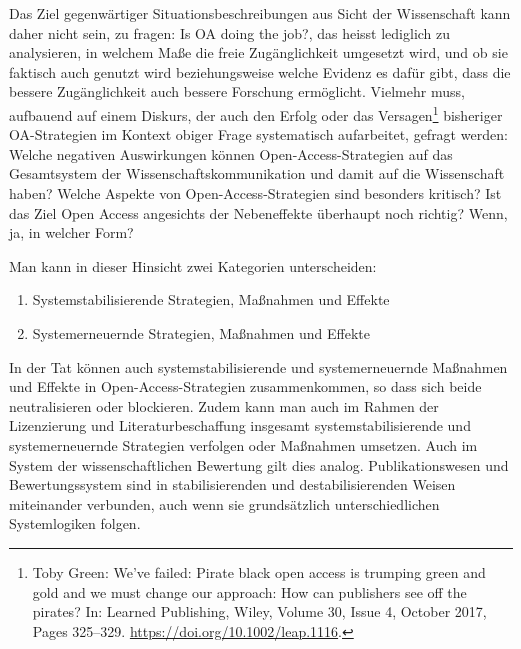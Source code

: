 \documentclass[a4paper,
fontsize=11pt,
oneside,
numbers=noperiodatend,
parskip=half-,
bibliography=totoc,
final
]{scrartcl}
\begin{document}
Das Ziel gegenwärtiger Situationsbeschreibungen aus Sicht der
Wissenschaft kann daher nicht sein, zu fragen: Is OA doing the job?, das
heisst lediglich zu analysieren, in welchem Maße die freie
Zugänglichkeit umgesetzt wird, und ob sie faktisch auch genutzt wird
beziehungsweise welche Evidenz es dafür gibt, dass die bessere
Zugänglichkeit auch bessere Forschung ermöglicht. Vielmehr muss,
aufbauend auf einem Diskurs, der auch den Erfolg oder das
Versagen\footnote{Toby Green: We've failed: Pirate black open access is
  trumping green and gold and we must change our approach: How can
  publishers see off the pirates? In: Learned Publishing, Wiley, Volume
  30, Issue 4, October 2017, Pages 325--329.
  \url{https://doi.org/10.1002/leap.1116}.} bisheriger OA-Strategien im
Kontext obiger Frage systematisch aufarbeitet, gefragt werden: Welche
negativen Auswirkungen können Open-Access-Strategien auf das
Gesamtsystem der Wissenschaftskommunikation und damit auf die
Wissenschaft haben? Welche Aspekte von Open-Access-Strategien sind
besonders kritisch? Ist das Ziel Open Access angesichts der Nebeneffekte
überhaupt noch richtig? Wenn, ja, in welcher Form?

Man kann in dieser Hinsicht zwei Kategorien unterscheiden:

\begin{enumerate}
\def\labelenumi{\arabic{enumi}.}
\item
  Systemstabilisierende Strategien, Maßnahmen und Effekte
\item
  Systemerneuernde Strategien, Maßnahmen und Effekte
\end{enumerate}

In der Tat können auch systemstabilisierende und systemerneuernde
Maßnahmen und Effekte in Open-Access-Strategien zusammenkommen, so dass
sich beide neutralisieren oder blockieren. Zudem kann man auch im Rahmen
der Lizenzierung und Literaturbeschaffung insgesamt
systemstabilisierende und systemerneuernde Strategien verfolgen oder
Maßnahmen umsetzen. Auch im System der wissenschaftlichen Bewertung gilt
dies analog. Publikationswesen und Bewertungssystem sind in
stabilisierenden und destabilisierenden Weisen miteinander verbunden,
auch wenn sie grundsätzlich unterschiedlichen Systemlogiken folgen.
\end{document}
